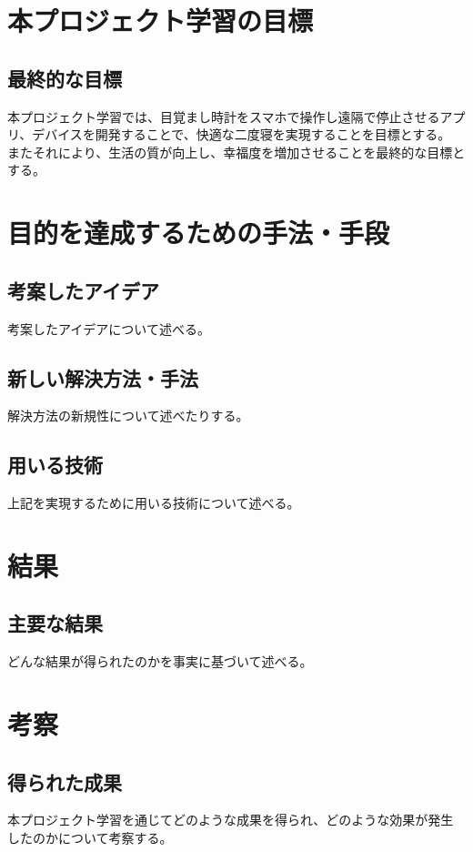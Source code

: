 \chapter{本プロジェクト学習の目標}
\section{最終的な目標}
本プロジェクト学習では、目覚まし時計をスマホで操作し遠隔で停止させるアプリ、デバイスを開発することで、快適な二度寝を実現することを目標とする。
またそれにより、生活の質が向上し、幸福度を増加させることを最終的な目標とする。

\chapter{目的を達成するための手法・手段}
\section{考案したアイデア}
考案したアイデアについて述べる。

\section{新しい解決方法・手法}
解決方法の新規性について述べたりする。

\section{用いる技術}
上記を実現するために用いる技術について述べる。

\chapter{結果}
\section{主要な結果}
どんな結果が得られたのかを事実に基づいて述べる。

\chapter{考察}
\section{得られた成果}
本プロジェクト学習を通じてどのような成果を得られ、どのような効果が発生したのかについて考察する。

